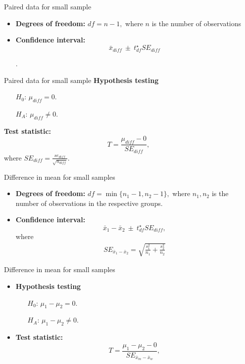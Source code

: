 \documentclass[12pt,a4paper]{beamer}
\begin{document}
\begin{frame}{Paired data for small sample}
	\begin{itemize}
		\item  \textbf{Degrees of freedom:} $df=n-1,$ where $n$ is the number of observations
		\vspace{0.3cm}
		\item \textbf{Confidence interval:}
		\[\bar{x}_{diff} \ \pm\  t^{\star}_{df}SE_{diff}\]

		.
	\end{itemize}
	

\end{frame}
\begin{frame}{Paired data for small sample}
	\textbf{Hypothesis testing}
	\begin{itemize}
	\setlength{\itemsep}{0mm}
	\item[$H_0$:] $\mu_{diff}=0$. 
	\item[$H_A$:] $\mu_{diff} \neq 0$. 
	\end{itemize}
	\textbf{Test statistic:}
	\[T=\frac{\mu_{diff}-0}{SE_{diff}},\]
	where $SE_{diff}=\frac{se_{diff}}{\sqrt{n_{diff}}}.$
\end{frame}
\begin{frame}{Difference in mean for small samples}
	\begin{itemize}
		\item  \textbf{Degrees of freedom:} $df=\min\{n_1-1,n_2-1\},$ where $n_1,n_2$ is the number of observations in the respective groups.
		\vspace{0.3cm}
		\item \textbf{Confidence interval:}
		\[\bar{x}_1-\bar{x}_2 \ \pm\  t^{\star}_{df}SE_{diff},\]
		where 
		\begin{eqnarray}
		SE_{\bar{x}_{1} - \bar{x}_{2}} = \sqrt{\frac{s_1^2}{n_1} + \frac{s_2^2}{n_2}}
		\end{eqnarray}
	\end{itemize}
\end{frame}
\begin{frame}{Difference in mean for small samples}
	\begin{itemize}
		\item\textbf{Hypothesis testing}
	\begin{itemize}
	\setlength{\itemsep}{0mm}
	\item[$H_0$:] $\mu_1-\mu_2=0$. 
	\item[$H_A$:] $\mu_{1}-\mu_{2} \neq 0$. 
	\end{itemize}
	\item\textbf{Test statistic:}
	\[T=\frac{\mu_1-\mu_2-0}{SE_{\bar{x}_{m} - \bar{x}_{w}}},\]
	\end{itemize}
	\end{frame}
\end{document}
